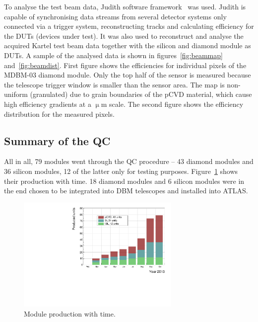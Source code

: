 To analyse the test beam data, Judith software framework~\cite{McGoldrick:1982209} was used. Judith is capable of synchronising data streams from several detector systems only connected via a trigger system, reconstructing tracks and calculating efficiency for the DUTs (devices under test). It was also used to reconstruct and analyse the acquired Kartel test beam data together with the silicon and diamond module as DUTs. A sample of the analysed data is shown in figures~\ref{fig:beammap} and~\ref{fig:beamdist}. First figure shows the efficiencies for individual pixels of the MDBM-03 diamond module. Only the top half of the sensor is measured because the telescope trigger window is smaller than the sensor area. The map is non-uniform (granulated) due to grain boundaries of the pCVD material, which cause high efficiency gradients at a $\upmu$m scale. The second figure shows the efficiency distribution for the measured pixels.





\subsection{Summary of the QC}
All in all, 79 modules went through the QC procedure -- 43 diamond modules and 36 silicon modules, 12 of the latter only for testing purposes. Figure~\ref{fig:production} shows their production with time. 18 diamond modules and 6 silicon modules were in the end chosen to be integrated into DBM telescopes and installed into ATLAS.


\begin{figure}[!t]
\centering
\includegraphics[width=0.7\textwidth]{../scripts/04_charge_monitoring/plots/production1}
\caption{Module production with time.}
\label{fig:production}
\end{figure}








